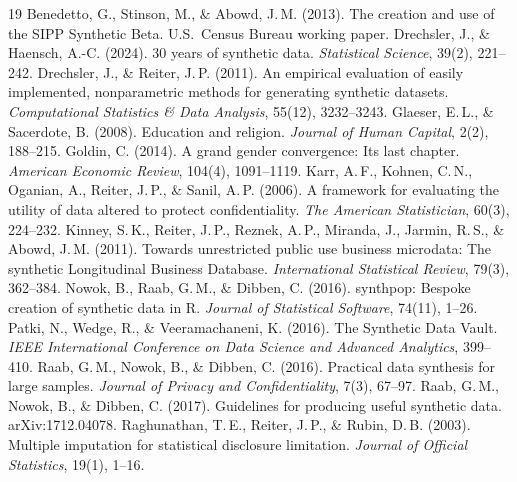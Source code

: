 \documentclass[10pt]{article}
\begin{document}
\begingroup\footnotesize
\begin{thebibliography}{19}\setlength{\itemsep}{0pt}
 Benedetto, G., Stinson, M., \& Abowd, J.\,M. (2013). The
  creation and use of the SIPP Synthetic Beta. U.S.\ Census Bureau working paper.
 Drechsler, J., \& Haensch, A.-C. (2024). 30 years of
  synthetic data. \emph{Statistical Science}, 39(2), 221--242.
 Drechsler, J., \& Reiter, J.\,P. (2011). An empirical
  evaluation of easily implemented, nonparametric methods for generating synthetic datasets.
  \emph{Computational Statistics \& Data Analysis}, 55(12), 3232--3243.
 Glaeser, E.\,L., \& Sacerdote, B. (2008). Education and
  religion. \emph{Journal of Human Capital}, 2(2), 188--215.
 Goldin, C. (2014). A grand gender convergence: Its last chapter.
  \emph{American Economic Review}, 104(4), 1091--1119.
 Karr, A.\,F., Kohnen, C.\,N., Oganian, A., Reiter, J.\,P., \&
  Sanil, A.\,P. (2006). A framework for evaluating the utility of data altered to protect confidentiality.
  \emph{The American Statistician}, 60(3), 224--232.
 Kinney, S.\,K., Reiter, J.\,P., Reznek, A.\,P., Miranda, J.,
  Jarmin, R.\,S., \& Abowd, J.\,M. (2011). Towards unrestricted public use business microdata: The
  synthetic Longitudinal Business Database. \emph{International Statistical Review}, 79(3), 362--384.
 Nowok, B., Raab, G.\,M., \& Dibben, C. (2016). synthpop: Bespoke
  creation of synthetic data in R. \emph{Journal of Statistical Software}, 74(11), 1--26.
 Patki, N., Wedge, R., \& Veeramachaneni, K. (2016). The Synthetic
  Data Vault. \emph{IEEE International Conference on Data Science and Advanced Analytics}, 399--410.
 Raab, G.\,M., Nowok, B., \& Dibben, C. (2016). Practical data
  synthesis for large samples. \emph{Journal of Privacy and Confidentiality}, 7(3), 67--97.
 Raab, G.\,M., Nowok, B., \& Dibben, C. (2017). Guidelines for
  producing useful synthetic data. arXiv:1712.04078.
 Raghunathan, T.\,E., Reiter, J.\,P., \& Rubin, D.\,B.
  (2003). Multiple imputation for statistical disclosure limitation. \emph{Journal of Official
  Statistics}, 19(1), 1--16.

\end{thebibliography}
\end{document}
